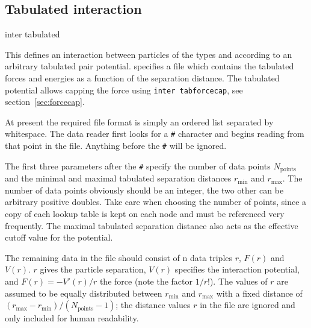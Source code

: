 \subsection{Tabulated interaction}
\label{sec:tabnonbonded}

\begin{essyntax}
  inter   tabulated %
  \begin{features}
  \end{features}
\end{essyntax}

This defines an interaction between particles of the types  and
 according to an arbitrary tabulated pair potential. 
specifies a file which contains the tabulated forces and energies as a function
of the separation distance. The tabulated potential allows capping the force
using {\tt inter tabforcecap}, see section~\ref{sec:forcecap}.

At present the required file format is simply an ordered list separated by
whitespace. The data reader first looks for a {\tt \#} character and begins
reading from that point in the file. Anything before the {\tt \#} will be
ignored.

The first three parameters after the {\tt \#} specify the number of data points
$N_\mathrm{points}$ and the minimal and maximal tabulated separation distances
$r_\mathrm{min}$ and $r_\mathrm{max}$. The number of data points obviously should
be an integer, the two other can be arbitrary positive doubles. Take care when
choosing the number of points, since a copy of each lookup table is kept on each
node and must be referenced very frequently. The maximal tabulated separation
distance also acts as the effective cutoff value for the potential.

The remaining data in the file should consist of n data triples $r$, $F(r)$ and
$V(r)$. $r$ gives the particle separation, $V(r)$ specifies the interaction
potential, and $F(r)= -V'(r)/r$ the force (note the factor $1/r$!). The values
of $r$ are assumed to be equally distributed between $r_\mathrm{min}$ and
$r_\mathrm{max}$ with a fixed distance of
$(r_\mathrm{max}-r_\mathrm{min})/(N_\mathrm{points}-1)$; the distance values $r$ in
the file are ignored and only included for human readability.

